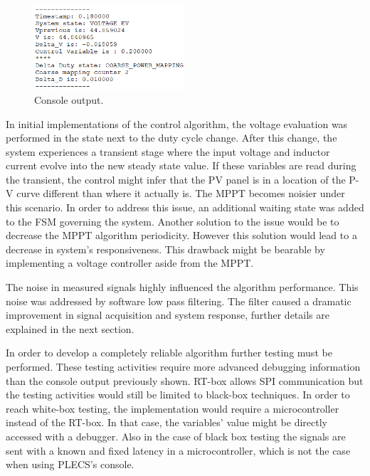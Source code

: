 \begin{figure}[htbp]
	\begin{center}
		\includegraphics[width=0.5\textwidth]{../Pictures/P1/Discussion/console_output.png}
		\caption{Console output.}
		\label{console_output}
	\end{center}	
\end{figure}

In initial implementations of the control algorithm, the voltage evaluation was performed in the state next to the duty cycle change. After this change, the system experiences a transient stage where the input voltage and inductor current evolve into the new steady state value. If these variables are read during the transient, the control might infer that the PV panel is in a location of the P-V curve different than where it actually is. The MPPT becomes noisier under this scenario. In order to address this issue, an additional waiting state was added to the FSM governing the system. Another solution to the issue would be to decrease the MPPT algorithm periodicity. However this solution would lead to a decrease in system's responsiveness. This drawback might be bearable by implementing a voltage controller aside from the MPPT.  

The noise in measured signals highly influenced the algorithm performance. This noise was addressed by software low pass filtering. The filter caused a dramatic improvement in signal acquisition and system response, further details are explained in the next section.

In order to develop a completely reliable algorithm further testing must be performed. These testing activities require more advanced debugging information than the console output previously shown. RT-box allows SPI communication but the testing activities would still be limited to black-box techniques. In order to reach white-box testing, the implementation would require a microcontroller instead of the RT-box. In that case, the variables' value might be directly accessed with a debugger. Also in the case of black box testing the signals are sent with a known and fixed latency in a microcontroller, which is not the case when using PLECS's console.

